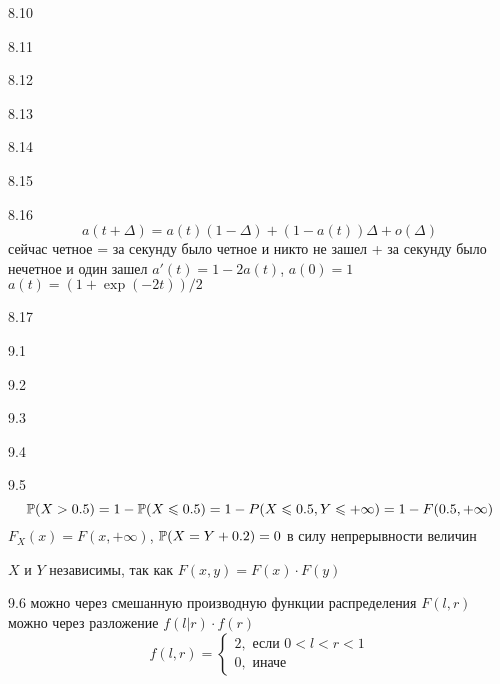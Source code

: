 \protect \hypertarget {soln:8.10}{}
\begin{solution}{{8.10}}
\end{solution}
\protect \hypertarget {soln:8.11}{}
\begin{solution}{{8.11}}
\end{solution}
\protect \hypertarget {soln:8.12}{}
\begin{solution}{{8.12}}
\end{solution}
\protect \hypertarget {soln:8.13}{}
\begin{solution}{{8.13}}
\end{solution}
\protect \hypertarget {soln:8.14}{}
\begin{solution}{{8.14}}
\end{solution}
\protect \hypertarget {soln:8.15}{}
\begin{solution}{{8.15}}
\end{solution}
\protect \hypertarget {soln:8.16}{}
\begin{solution}{{8.16}}
  \[ a(t+\Delta)=a(t)(1-\Delta)+(1-a(t))\Delta + o(\Delta) \]
  сейчас четное = за секунду было четное и никто не зашел + за секунду было нечетное и один зашел
  $a'(t)=1-2a(t)$, $a(0)=1$
  $a(t)=(1+\exp(-2t))/2$
\end{solution}
\protect \hypertarget {soln:8.17}{}
\begin{solution}{{8.17}}
\end{solution}
\protect \hypertarget {soln:9.1}{}
\begin{solution}{{9.1}}
\end{solution}
\protect \hypertarget {soln:9.2}{}
\begin{solution}{{9.2}}
\end{solution}
\protect \hypertarget {soln:9.3}{}
\begin{solution}{{9.3}}
\end{solution}
\protect \hypertarget {soln:9.4}{}
\begin{solution}{{9.4}}
\end{solution}
\protect \hypertarget {soln:9.5}{}
\begin{solution}{{9.5}}
  \[
  \P(X>0.5) = 1 - \P(X\leq 0.5) = 1 - P(X\leq 0.5, Y\leq +\infty) = 1 - F(0.5, +\infty)
  \]
  $F_X(x)=F(x, +\infty)$, $\P(X=Y+0.2)=0$ в силу непрерывности величин

  $X$ и $Y$ независимы, так как $F(x,y)=F(x)\cdot F(y)$
\end{solution}
\protect \hypertarget {soln:9.6}{}
\begin{solution}{{9.6}}
  можно через смешанную производную функции распределения $F(l,r)$
  можно через разложение $f(l|r)\cdot f(r)$
  \[
  f(l,r)=\begin{cases}
  2, \text{ если } 0<l<r<1 \\
  0, \text{ иначе }
  \end{cases}
  \]
\end{solution}
